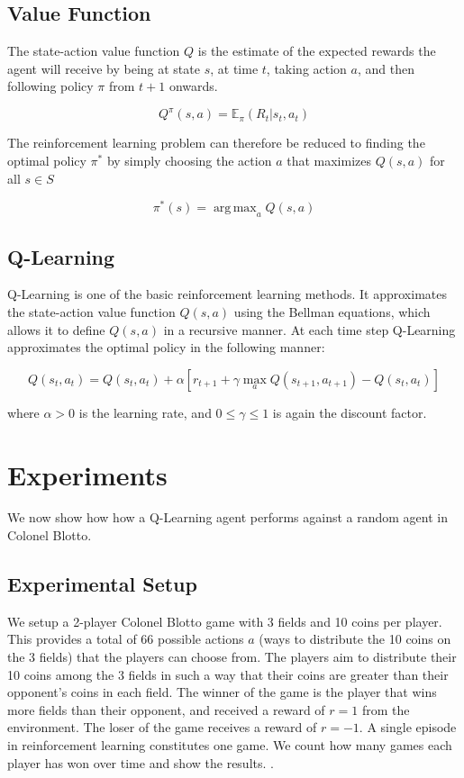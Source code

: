 \documentclass[11pt, oneside]{article}   	%
\DeclareMathOperator*{\argmax}{arg\,max}
\begin{document}
\subsection{Value Function}
The state-action value function $Q$ is the estimate of the expected rewards the agent will receive by being at state $s$, at time $t$, taking action $a$, and then following policy $\pi$ from $t+1$ onwards. 

\begin{equation}
Q^\pi(s,a) = \mathbb{E}_\pi(R_t | s_t, a_t)
\end{equation}

The reinforcement learning problem can therefore be reduced to finding the optimal policy $\pi^*$ by simply choosing the action $a$ that maximizes $Q(s,a)$ for all $s \in S$ 

\begin{equation}
\pi^*(s) = \argmax_a{Q(s,a)}
\end{equation}
\subsection{Q-Learning}

Q-Learning is one of the basic reinforcement learning methods. It approximates the state-action value function $Q(s,a)$ using the Bellman equations, which allows it to define $Q(s,a)$ in a recursive manner. At each time step Q-Learning approximates the optimal policy in the following manner:

\begin{equation}
Q(s_t, a_t) = Q(s_t, a_t) + \alpha[r_{t+1} + \gamma \max_aQ(s_{t+1}, a_{t+1}) - Q(s_t, a_t)]
\end{equation}

where $\alpha > 0$ is the learning rate, and $0 \leq \gamma \leq 1$ is again the discount factor.

\section{Experiments}

We now show how how a Q-Learning agent performs against a random agent in Colonel Blotto.

\subsection{Experimental Setup}

We setup a 2-player Colonel Blotto game with 3 fields and 10 coins per player. This provides a total of 66 possible actions $a$ (ways to distribute the 10 coins on the 3 fields) that the players can choose from. The players aim to distribute their 10 coins among the 3 fields in such a way that their coins are greater than their opponent's coins in each field. The winner of the game is the player that wins more fields than their opponent, and received a reward of $r=1$ from the environment. The loser of the game receives a reward of $r=-1$. A single episode in reinforcement learning constitutes one game. We count how many games each player has won over time and show the results. .
\end{document}
